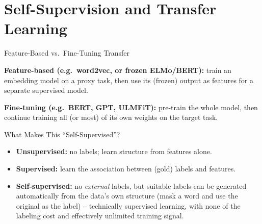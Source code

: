 
\section{Self-Supervision and Transfer Learning}

\begin{vbframe}{Feature-Based vs.\ Fine-Tuning Transfer}

\vfill

\textbf{Feature-based (e.g.\ word2vec, or frozen ELMo/BERT):} train an embedding model on a proxy task, then use its (frozen) output as features for a separate supervised model.

\textbf{Fine-tuning (e.g.\ BERT, GPT, ULMFiT):} pre-train the whole model, then continue training all (or most) of its own weights on the target task.

\vfill

\end{vbframe}

\begin{vbframe}{What Makes This ``Self-Supervised''?}

\vfill

\begin{itemize}
	\item \textbf{Unsupervised:} no labels; learn structure from features alone.
	\item \textbf{Supervised:} learn the association between (gold) labels and features.
	\item \textbf{Self-supervised:} no \emph{external} labels, but suitable labels can be generated automatically from the data's own structure (mask a word and use the original as the label) -- technically supervised learning, with none of the labeling cost and effectively unlimited training signal.
\end{itemize}

\vfill

\end{vbframe}

